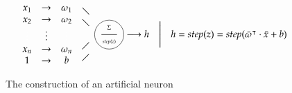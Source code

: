 \documentclass[10pt]{article}
\newcommand*\circled[1]{\tikz[baseline=(char.base)]{
   \node[shape=circle,draw,inner sep=1pt] (char) {#1};}}
\newif\ifen
\newif\ifde
\newcommand{\en}[1]{\ifen#1\fi}
\newcommand{\de}[1]{\ifde#1\fi}
\begin{document}
				\begin{figure}[H]
					\[
						\begin{array}{c}
							x_1\\
							x_2\\
							\color{white}\vdots\\
							x_n\\
							1\\
						\end{array}
						\begin{array}{c}
							\rightarrow\\
							\rightarrow\\
							\vdots\\
							\rightarrow\\
							\rightarrow\\
						\end{array}
						\begin{array}{c}
							\omega_1\\
							\omega_2\\
							\color{white}\vdots\\
							\omega_n\\
							b\\
						\end{array}
						\begin{array}{c}
							\diagdown\\
							\diagdown\\
							\\
							\diagup\\
							\diagup\\
						\end{array}
						\circled{${\sum\atop\ }\over{\ \atop step(z)}$}
						\longrightarrow h
						\quad\Biggl\lvert \quad h = step(z) = step(\bar{\omega}^\intercal \cdot \bar{x} + b)
					\]
					\caption{The construction of an artificial neuron}
					\label{fig:construction_of_an_an}
				\end{figure}

				\de{Das künstliche neuronale Netz baut sich aus vielen hintereinandergeschalteten Layern zusammen, welche wiederrum parallel geschaltete Neuronen enthalten:}
				\en{The artificial neural network is composed of many layers connected in series, which again contain neurons connected in parallel (Figure \ref{fig:construction_of_a_simple_ann}).}
\end{document}
